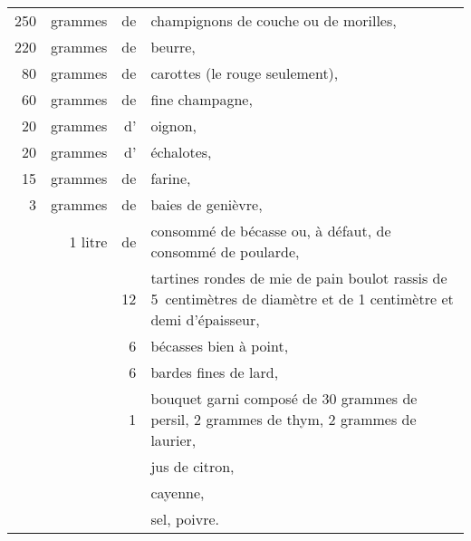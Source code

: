 \footnotesize
\begin{longtable}{rrrp{16em}}
    250 & grammes & de & champignons de couche ou de morilles,                                            \\
    220 & grammes & de & beurre,                                                                          \\
     80 & grammes & de & carottes (le rouge seulement),                                                   \\
     60 & grammes & de & fine champagne,                                                                  \\
     20 & grammes & d' & oignon,                                                                          \\
     20 & grammes & d' & échalotes,                                                                       \\
     15 & grammes & de & farine,                                                                          \\
      3 & grammes & de & baies de genièvre,                                                               \\
        & 1 litre & de & consommé de bécasse ou, à défaut, de consommé de poularde,                       \\
        &         & 12 & tartines rondes de mie de pain boulot rassis de
                         5 centi\-mètres de diamètre et de 1 centi\-mètre et demi d'épais\-seur,          \\
        &         &  6 & bécasses bien à point,                                                           \\
        &         &  6 & bardes fines de lard,                                                            \\
        &         &  1 & bouquet garni composé de 30 gram\-mes de persil,
                         2 gram\-mes de thym, 2 gram\-mes de lau\-rier,                                   \\
        &         &    & jus de citron,                                                                   \\
        &         &    & cayenne,                                                                         \\
        &         &    & sel, poivre.                                                                     \\
\end{longtable}
\normalsize

